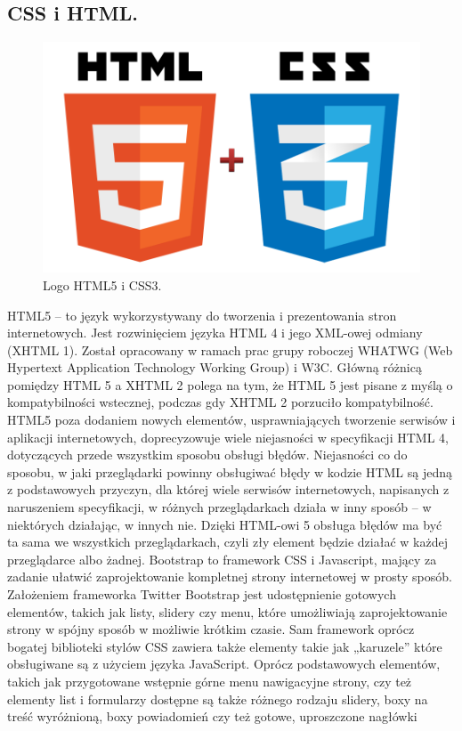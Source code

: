 \documentclass[a4paper,12pt]{article}		%
\begin{document}
\subsection{CSS i HTML.}

\begin{figure}[h!]
\centering
\includegraphics[scale=0.3]{Resources/html5css3.png}
\caption{Logo HTML5 i CSS3.} 
\end{figure}

HTML5 – to język wykorzystywany do tworzenia i prezentowania stron internetowych. Jest rozwinięciem języka HTML 4 i jego XML-owej odmiany (XHTML 1). Został opracowany w ramach prac grupy roboczej WHATWG (Web Hypertext Application Technology Working Group) i W3C. Główną różnicą pomiędzy HTML 5 a XHTML 2 polega na tym, że HTML 5 jest pisane z myślą o kompatybilności wstecznej, podczas gdy XHTML 2 porzuciło kompatybilność. HTML5 poza dodaniem nowych elementów, usprawniających tworzenie serwisów i aplikacji internetowych, doprecyzowuje wiele niejasności w specyfikacji HTML 4, dotyczących przede wszystkim sposobu obsługi błędów. Niejasności co do sposobu, w jaki przeglądarki powinny obsługiwać błędy w kodzie HTML są jedną z podstawowych przyczyn, dla której wiele serwisów internetowych, napisanych z naruszeniem specyfikacji, w różnych przeglądarkach działa w inny sposób – w niektórych działając, w innych nie. Dzięki HTML-owi 5 obsługa błędów ma być ta sama we wszystkich przeglądarkach, czyli zły element będzie działać w każdej przeglądarce albo żadnej.
Bootstrap to framework CSS i Javascript, mający za zadanie ułatwić zaprojektowanie kompletnej strony internetowej w prosty sposób. Założeniem frameworka Twitter Bootstrap jest udostępnienie gotowych elementów, takich jak listy, slidery czy menu, które umożliwiają zaprojektowanie strony w spójny sposób w możliwie krótkim czasie. Sam framework oprócz bogatej biblioteki stylów CSS zawiera także elementy takie jak „karuzele” które obsługiwane są z użyciem języka JavaScript. Oprócz podstawowych elementów, takich jak przygotowane wstępnie górne menu nawigacyjne strony, czy też elementy list i formularzy dostępne są także różnego rodzaju slidery, boxy na treść wyróżnioną, boxy powiadomień czy też gotowe, uproszczone nagłówki
\end{document}
